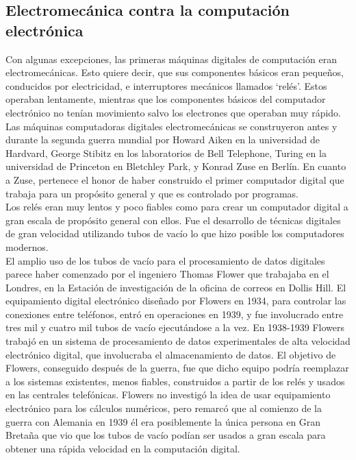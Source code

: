 \documentclass[a4paper]{article}
\begin{document}
    \subsection*{Electromecánica contra la computación electrónica}

    Con algunas excepciones, las primeras máquinas digitales de computación eran electromecánicas. Esto quiere decir, que sus componentes básicos eran pequeños, conducidos por electricidad, e interruptores mecánicos llamados ‘relés’. Estos operaban lentamente, mientras que los componentes básicos del computador electrónico no tenían movimiento salvo los electrones que operaban muy rápido. Las máquinas computadoras digitales electromecánicas se construyeron antes y durante la segunda guerra mundial por Howard Aiken en la universidad de Hardvard, George Stibitz en los laboratorios de Bell Telephone, Turing en la universidad de Princeton en Bletchley Park, y Konrad Zuse en Berlín. En cuanto a Zuse, pertenece el honor de haber construido el primer computador digital que trabaja para un propósito general y que es controlado por programas.\\

    Los relés eran muy lentos y poco fiables como para crear un computador digital a gran escala de propósito general con ellos. Fue el desarrollo de técnicas digitales de gran velocidad utilizando tubos de vacío lo que hizo posible los computadores modernos.\\

    El amplio uso de los tubos de vacío para el procesamiento de datos digitales parece haber comenzado por el ingeniero Thomas Flower que trabajaba en el Londres, en la Estación de investigación de la oficina de correos en Dollis Hill. El equipamiento digital electrónico diseñado por Flowers en 1934, para controlar las conexiones entre teléfonos, entró en operaciones en 1939, y fue involucrado entre tres mil y cuatro mil tubos de vacío ejecutándose a la vez. En 1938-1939 Flowers trabajó en un sistema de procesamiento de datos experimentales de alta velocidad electrónico digital, que involucraba el almacenamiento de datos. El objetivo de Flowers, conseguido después de la guerra, fue que dicho equipo podría reemplazar a los sistemas existentes, menos fiables, construidos a partir de los relés y usados en las centrales telefónicas. Flowers no investigó la idea de usar equipamiento electrónico para los cálculos numéricos, pero remarcó que al comienzo de la guerra con Alemania en 1939 él era posiblemente la única persona en Gran Bretaña  que vio que los tubos de vacío podían ser usados a gran escala para obtener una rápida velocidad en la computación digital.
\end{document}
